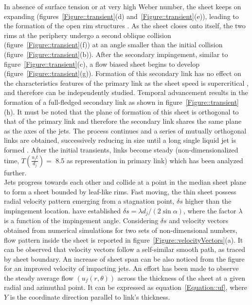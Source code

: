 \documentclass{jfm}
\begin{document}
In absence of surface tension or at very high Weber number, the sheet keeps on expanding (figures~\ref{Figure::transient}(d) and~\ref{Figure::transient}(e)), leading to the formation of the open rim structures \citep{taylor1960formation,chen2013high}. As the sheet closes onto itself, the two rims at the periphery undergo a second oblique collision (figure~\ref{Figure::transient}(f)) at an angle smaller than the initial collision (figure~\ref{Figure::transient}(b)). After the secondary impingement, similar to figure~\ref{Figure::transient}(c), a flow biased sheet begins to develop (figure~\ref{Figure::transient}(g)). Formation of this secondary link has no effect on the characteristics features of the primary link as the sheet speed is supercritical \citep{bush2004collision}, and therefore can be independently studied. Temporal advancement results in the formation of a full-fledged secondary link as shown in figure~\ref{Figure::transient}(h). It must be noted that the plane of formation of this sheet is orthogonal to that of the primary link and therefore the secondary link shares the same plane as the axes of the jets. The process continues and a series of mutually orthogonal links are obtained, successively reducing in size until a long single liquid jet is formed \citep{bush2004collision}. After the initial transients, links become steady (non-dimensionalized time, $T \left(\frac{u_jt}{d_j}\right) = $ 8.5 as representation in primary link) which has been analyzed further. \\
Jets progress towards each other and collide at a point in the median sheet plane to form a sheet bounded by leaf-like rims. Fast moving, the thin sheet possess radial velocity pattern emerging from a stagnation point, $\delta s$ higher than the impingement location. \cite{inamura2014effect} have established $\delta s = \lambda d_j/(2\sin\alpha)$, where the factor $\lambda$ is a function of the impingement angle. Considering $\delta s$ and velocity vectors obtained from numerical simulations for two sets of non-dimensional numbers, flow pattern inside the sheet is reported in figure~\ref{Figure::velocityVectors}(a). It can be observed that velocity vectors follow a self-similar smooth path, as traced by sheet boundary. An increase of sheet span can be also noticed from the figure for an improved velocity of impacting jets.  
An effort has been made to observe the steady average flow $\left(u_f(r,\theta)\right)$ across the thickness of the sheet at a given radial and azimuthal point. It can be expressed as equation~\ref{Equation::uf}, where $Y$ is the coordinate direction parallel to link's thickness. 
\end{document}
